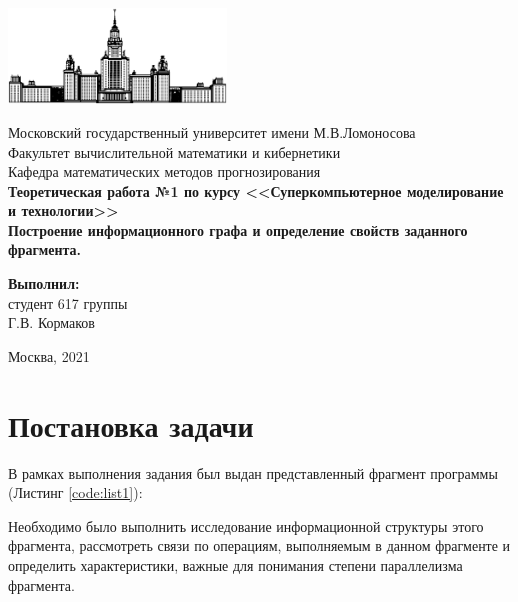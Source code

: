 \documentclass[12pt, fleqn]{article}
\theoremstyle{definition}
\begin{document}
\hypersetup{pageanchor=false}
\begin{titlepage}
\begin{center}
    \includegraphics[width=58mm]{msu.eps}
    
    Московский государственный университет имени М.В.Ломоносова\\
    Факультет вычислительной математики и кибернетики\\
    Кафедра математических методов прогнозирования\\[25mm]

    \textsf{
        \Large\bfseries 
        Теоретическая работа №1 по курсу <<Суперкомпьютерное моделирование и технологии>>
        \\[5mm] 
        Построение информационного графа и определение свойств заданного фрагмента.
    }\\[12mm]
    
    \begin{flushright}
        \parbox{0.5\textwidth}{
        \begin{flushright}
            \textbf{Выполнил:}\\
            студент 617 группы \\
            Г.В. Кормаков
        \end{flushright}
        }
    \end{flushright}

    \vspace{\fill}
    Москва, 2021
\end{center}

\end{titlepage}
\hypersetup{pageanchor=true}
\tableofcontents
\newpage
\section{Постановка задачи}
В рамках выполнения задания был выдан представленный фрагмент программы (Листинг \ref{code:list1}):
{}

Необходимо было выполнить исследование информационной структуры этого фрагмента, рассмотреть связи по операциям, выполняемым в данном фрагменте и определить характеристики, важные для понимания степени параллелизма фрагмента.
\end{document}
